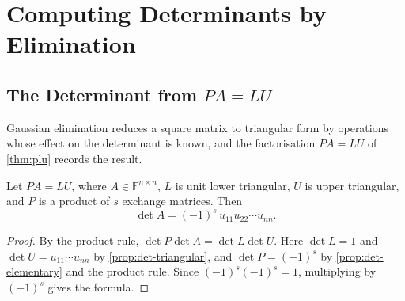 \section{Computing Determinants by Elimination}
\label{sec:det-elimination}

\subsection{The Determinant from \texorpdfstring{$PA=LU$}{PA = LU}}

Gaussian elimination reduces a square matrix to triangular form by operations whose effect on the determinant is known, and the factorisation $PA=LU$ of \cref{thm:plu} records the result.

\begin{theorem}
\label{thm:det-plu}
Let $PA=LU$, where $A\in\mathbb F^{n\times n}$, $L$ is unit lower triangular, $U$ is upper triangular, and $P$ is a product of $s$ exchange matrices. Then
\[
\det A=(-1)^s\,u_{11}u_{22}\cdots u_{nn}.
\]
\end{theorem}

\begin{proof}
By the product rule, $\det P\det A=\det L\det U$. Here $\det L=1$ and $\det U=u_{11}\cdots u_{nn}$ by \cref{prop:det-triangular}, and $\det P=(-1)^s$ by \cref{prop:det-elementary} and the product rule. Since $(-1)^s(-1)^s=1$, multiplying by $(-1)^s$ gives the formula.
\end{proof}

